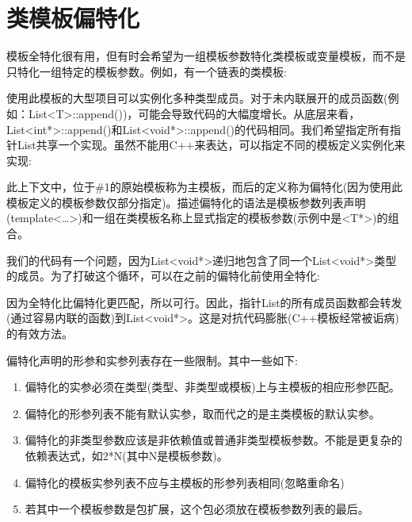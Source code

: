 \section{类模板偏特化}

模板全特化很有用，但有时会希望为一组模板参数特化类模板或变量模板，而不是只特化一组特定的模板参数。例如，有一个链表的类模板:


使用此模板的大型项目可以实例化多种类型成员。对于未内联展开的成员函数(例如：List<T>::append())，可能会导致代码的大幅度增长。从底层来看，List<int*>::append()和List<void*>::append()的代码相同。我们希望指定所有指针List共享一个实现。虽然不能用C++来表达，可以指定不同的模板定义实例化来实现:


此上下文中，位于\#1的原始模板称为主模板，而后的定义称为偏特化(因为使用此模板定义的模板参数仅部分指定)。描述偏特化的语法是模板参数列表声明(template<…>)和一组在类模板名称上显式指定的模板参数(示例中是<T*>)的组合。

我们的代码有一个问题，因为List<void*>递归地包含了同一个List<void*>类型的成员。为了打破这个循环，可以在之前的偏特化前使用全特化:


因为全特化比偏特化更匹配，所以可行。因此，指针List的所有成员函数都会转发(通过容易内联的函数)到List<void*>。这是对抗代码膨胀(C++模板经常被诟病)的有效方法。

偏特化声明的形参和实参列表存在一些限制。其中一些如下:

\begin{enumerate}
\item 
偏特化的实参必须在类型(类型、非类型或模板)上与主模板的相应形参匹配。

\item 
偏特化的形参列表不能有默认实参，取而代之的是主类模板的默认实参。

\item 
偏特化的非类型参数应该是非依赖值或普通非类型模板参数。不能是更复杂的依赖表达式，如2*N(其中N是模板参数)。

\item 
偏特化的模板实参列表不应与主模板的形参列表相同(忽略重命名)

\item 
若其中一个模板参数是包扩展，这个包必须放在模板参数列表的最后。
\end{enumerate}

